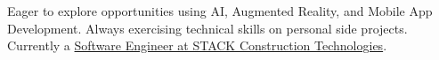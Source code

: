 \vspace{1pc}

\noindent Eager to explore opportunities using AI, Augmented Reality, and Mobile App Development. Always exercising technical skills on personal side projects. Currently a \underline{Software Engineer at STACK Construction Technologies}.
\vspace{1pc}